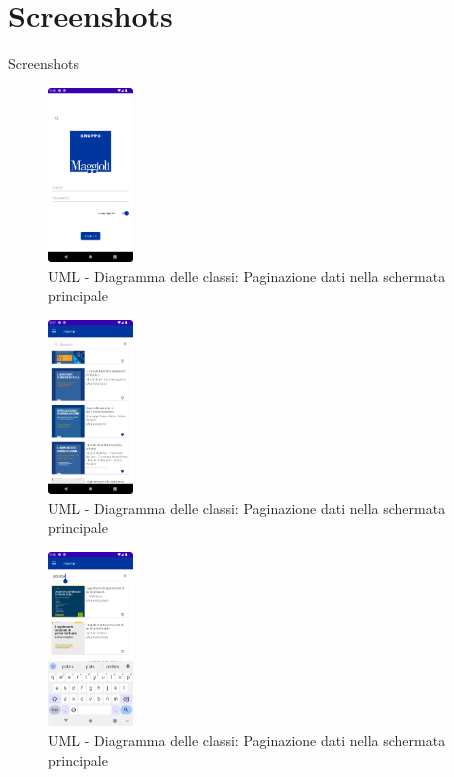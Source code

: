 \documentclass[10pt]{beamer}
\begin{document}
\section{Screenshots}
    \begin{frame}{Screenshots}
    \begin{multicols}{3}
        \begin{figure}[H]
        \includegraphics[width=0.2\textwidth]{login.png}
        \caption{UML - Diagramma delle classi: Paginazione dati nella schermata principale}
        \label{login}
        \end{figure}
                \begin{figure}[H]
        \includegraphics[width=0.2\textwidth]{home.png}
        \caption{UML - Diagramma delle classi: Paginazione dati nella schermata principale}
        \label{home}
        \end{figure}
                        \begin{figure}[H]
        \includegraphics[width=0.2\textwidth]{ricerca.png}
        \caption{UML - Diagramma delle classi: Paginazione dati nella schermata principale}
        \label{ricerca}
        \end{figure}
        \end{multicols}
    \end{frame}
\end{document}
